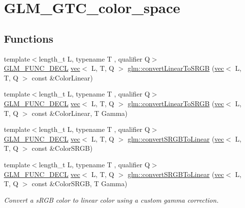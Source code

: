 \hypertarget{group__gtc__color__space}{}\section{G\+L\+M\+\_\+\+G\+T\+C\+\_\+color\+\_\+space}
\label{group__gtc__color__space}
\subsection*{Functions}
\begin{DoxyCompactItemize}
\item 
{\footnotesize template$<$length\+\_\+t L, typename T , qualifier Q$>$ }\\\hyperlink{setup_8hpp_ab2d052de21a70539923e9bcbf6e83a51}{G\+L\+M\+\_\+\+F\+U\+N\+C\+\_\+\+D\+E\+CL} \hyperlink{structglm_1_1vec}{vec}$<$ L, T, Q $>$ \hyperlink{group__gtc__color__space_ga42239e7b3da900f7ef37cec7e2476579}{glm\+::convert\+Linear\+To\+S\+R\+GB} (\hyperlink{structglm_1_1vec}{vec}$<$ L, T, Q $>$ const \&Color\+Linear)
\item 
{\footnotesize template$<$length\+\_\+t L, typename T , qualifier Q$>$ }\\\hyperlink{setup_8hpp_ab2d052de21a70539923e9bcbf6e83a51}{G\+L\+M\+\_\+\+F\+U\+N\+C\+\_\+\+D\+E\+CL} \hyperlink{structglm_1_1vec}{vec}$<$ L, T, Q $>$ \hyperlink{group__gtc__color__space_gaace0a21167d13d26116c283009af57f6}{glm\+::convert\+Linear\+To\+S\+R\+GB} (\hyperlink{structglm_1_1vec}{vec}$<$ L, T, Q $>$ const \&Color\+Linear, T Gamma)
\item 
{\footnotesize template$<$length\+\_\+t L, typename T , qualifier Q$>$ }\\\hyperlink{setup_8hpp_ab2d052de21a70539923e9bcbf6e83a51}{G\+L\+M\+\_\+\+F\+U\+N\+C\+\_\+\+D\+E\+CL} \hyperlink{structglm_1_1vec}{vec}$<$ L, T, Q $>$ \hyperlink{group__gtc__color__space_ga16c798b7a226b2c3079dedc55083d187}{glm\+::convert\+S\+R\+G\+B\+To\+Linear} (\hyperlink{structglm_1_1vec}{vec}$<$ L, T, Q $>$ const \&Color\+S\+R\+GB)
\item 
{\footnotesize template$<$length\+\_\+t L, typename T , qualifier Q$>$ }\\\hyperlink{setup_8hpp_ab2d052de21a70539923e9bcbf6e83a51}{G\+L\+M\+\_\+\+F\+U\+N\+C\+\_\+\+D\+E\+CL} \hyperlink{structglm_1_1vec}{vec}$<$ L, T, Q $>$ \hyperlink{group__gtc__color__space_gad1b91f27a9726c9cb403f9fee6e2e200}{glm\+::convert\+S\+R\+G\+B\+To\+Linear} (\hyperlink{structglm_1_1vec}{vec}$<$ L, T, Q $>$ const \&Color\+S\+R\+GB, T Gamma)
\begin{DoxyCompactList}\small\item\em Convert a s\+R\+GB color to linear color using a custom gamma correction. \end{DoxyCompactList}\end{DoxyCompactItemize}


